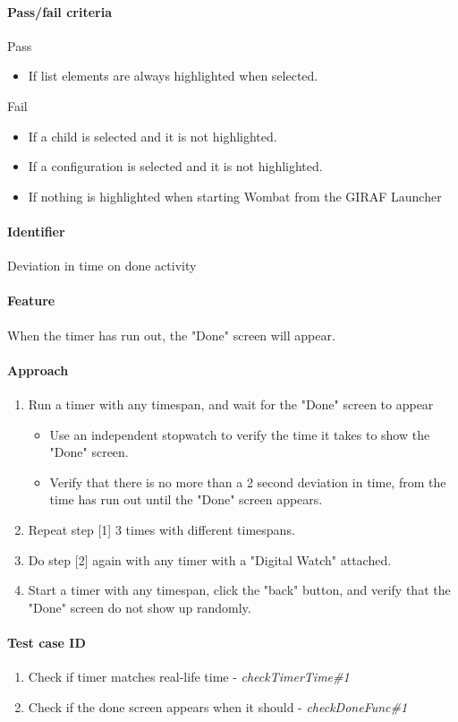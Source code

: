 \paragraph{Pass/fail criteria}
	Pass
	\begin{itemize}
		\item If list elements are always highlighted when selected.
	\end{itemize}
	Fail
	\begin{itemize}
		\item If a child is selected and it is not highlighted.
		\item If a configuration is selected and it is not highlighted.
		\item If nothing is highlighted when starting Wombat from the GIRAF Launcher
	\end{itemize}

\clearpage
\paragraph{Identifier}
	Deviation in time on done activity
\paragraph{Feature}
	When the timer has run out, the "Done" screen will appear. 
\paragraph{Approach}
	\begin{enumerate} 
		\item Run a timer with any timespan, and wait for the "Done" screen to appear
			\begin{itemize}
				\item Use an independent stopwatch to verify the time it takes to show the "Done" screen.
				\item Verify that there is no more than a 2 second deviation in time, from the time has run out until the "Done" screen appears.
			\end{itemize}
		\item Repeat step [1] 3 times with different timespans.
		\item Do step [2] again with any timer with a "Digital Watch" attached.
		\item Start a timer with any timespan, click the "back" button, and verify that the "Done" screen do not show up randomly.
	\end{enumerate}
\paragraph{Test case ID}
	\begin{enumerate}
		\item Check if timer matches real-life time - \textit{checkTimerTime\#1}
		\item Check if the done screen appears when it should - \textit{checkDoneFunc\#1}
	\end{enumerate}
